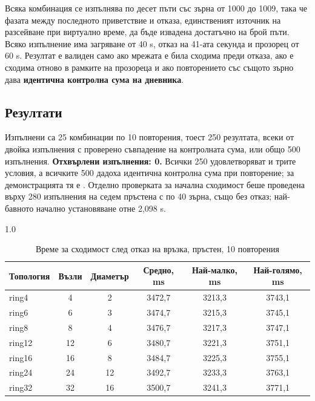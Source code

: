 Всяка комбинация се изпълнява по десет пъти със зърна от 1000 до 1009, така че фазата между
последното приветствие и отказа, единственият източник на разсейване при виртуално време, да
бъде извадена достатъчно на брой пъти. Всяко изпълнение има загряване от 40 s, отказ на 41-ата
секунда и прозорец от 60 s. Резултат е валиден само ако мрежата е била сходима преди отказа,
ако е сходима отново в рамките на прозореца и ако повторението със същото зърно дава
\textbf{идентична контролна сума на дневника}.

\subsection{Резултати}

Изпълнени са 25 комбинации по 10 повторения, тоест 250 резултата, всеки от двойка изпълнения с
проверено съвпадение на контролната сума, или общо 500 изпълнения. \textbf{Отхвърлени
изпълнения: 0.} Всички 250 удовлетворяват и трите условия, а всичките 500 дадоха идентична
контролна сума при повторение; за демонстрацията тя е
. Отделно
проверката за начална сходимост беше проведена върху 280 изпълнения на седем пръстена с по 40
зърна, също без отказ; най-бавното начално установяване отне 2,098 s.

\begin{table}[!htb]
\caption{Време за сходимост след отказ на връзка, пръстен, 10 повторения}
\label{tab:convergence}
\centering
\fontsize{11}{13}\selectfont
\begin{spacing}{1.0}
\begin{tabular}{lccccc}
\toprule
Топология & Възли & Диаметър & Средно, ms & Най-малко, ms & Най-голямо, ms \\
\midrule
ring4  & 4  & 2  & 3472,7 & 3213,3 & 3743,1 \\
ring6  & 6  & 3  & 3474,7 & 3215,3 & 3745,1 \\
ring8  & 8  & 4  & 3476,7 & 3217,3 & 3747,1 \\
ring12 & 12 & 6  & 3480,7 & 3221,3 & 3751,1 \\
ring16 & 16 & 8  & 3484,7 & 3225,3 & 3755,1 \\
ring24 & 24 & 12 & 3492,7 & 3233,3 & 3763,1 \\
ring32 & 32 & 16 & 3500,7 & 3241,3 & 3771,1 \\
\bottomrule
\end{tabular}
\end{spacing}
\end{table}

